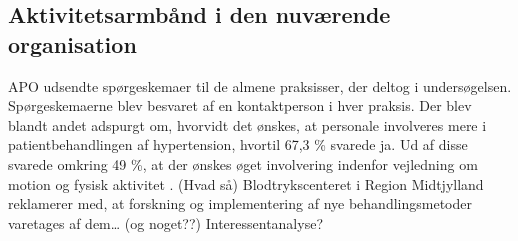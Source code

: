 \subsection{Aktivitetsarmbånd i den nuværende organisation}
APO udsendte spørgeskemaer til de almene praksisser, der deltog i undersøgelsen. Spørgeskemaerne blev besvaret af en kontaktperson i hver praksis. Der blev blandt andet adspurgt om, hvorvidt det ønskes, at personale involveres mere i patientbehandlingen af hypertension, hvortil 67,3 \% svarede ja. Ud af disse svarede omkring 49 \%, at der ønskes øget involvering indenfor vejledning om motion og fysisk aktivitet \citep{munch2007}. 
(Hvad så)
Blodtrykscenteret i Region Midtjylland reklamerer med, at forskning og implementering af nye behandlingsmetoder varetages af dem…  \citep{aarhusuniversitetshospital} (og noget??)
Interessentanalyse?


